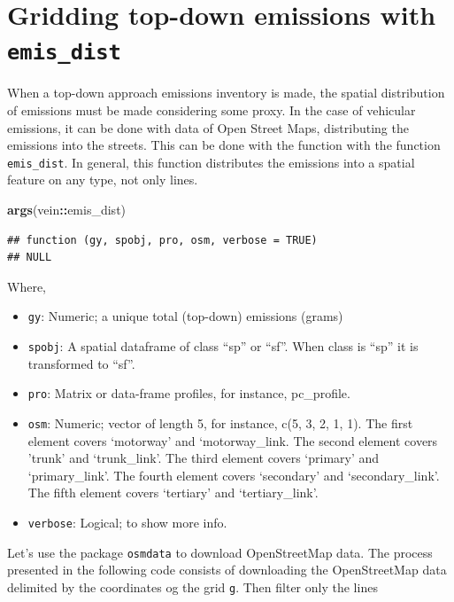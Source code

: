 \documentclass[12pt,graybox,envcountchap,sectrefs]{krantz}
\makeatletter
\newenvironment{Shaded}{\begin{snugshade}}{\end{snugshade}}
\newcommand{\KeywordTok}[1]{\textcolor[rgb]{0.13,0.29,0.53}{\textbf{#1}}}
\newcommand{\OperatorTok}[1]{\textcolor[rgb]{0.81,0.36,0.00}{\textbf{#1}}}
\newcommand{\NormalTok}[1]{#1}
\providecommand{\tightlist}{%
  \setlength{\itemsep}{0pt}\setlength{\parskip}{0pt}}
\newenvironment{kframe}{%
\medskip{}
\setlength{\fboxsep}{.8em}
 \def\at@end@of@kframe{}%
 \ifinner\ifhmode%
  \def\at@end@of@kframe{\end{minipage}}%
  \begin{minipage}{\columnwidth}%
 \fi\fi%
 \def\FrameCommand##1{\hskip\@totalleftmargin \hskip-\fboxsep
 \colorbox{shadecolor}{##1}\hskip-\fboxsep
     \hskip-\linewidth \hskip-\@totalleftmargin \hskip\columnwidth}%
 \MakeFramed {\advance\hsize-\width
   \@totalleftmargin\z@ \linewidth\hsize
   \@setminipage}}%
 {\par\unskip\endMakeFramed%
 \at@end@of@kframe}
\renewenvironment{Shaded}{\begin{kframe}}{\end{kframe}}
\theoremstyle{definition}
\theoremstyle{definition}
\theoremstyle{definition}
\theoremstyle{remark}
\makeatother
\begin{document}
\section{\texorpdfstring{Gridding top-down emissions with
\texttt{emis\_dist}}{Gridding top-down emissions with emis\_dist}}\label{gridding-top-down-emissions-with-emis_dist}

When a top-down approach emissions inventory is made, the spatial
distribution of emissions must be made considering some proxy. In the
case of vehicular emissions, it can be done with data of Open Street
Maps, distributing the emissions into the streets. This can be done with
the function with the function \texttt{emis\_dist}. In general, this
function distributes the emissions into a spatial feature on any type,
not only lines.

\begin{Shaded}
\begin{Highlighting}[]
\KeywordTok{args}\NormalTok{(vein}\OperatorTok{::}\NormalTok{emis_dist)}
\end{Highlighting}
\end{Shaded}

\begin{verbatim}
## function (gy, spobj, pro, osm, verbose = TRUE) 
## NULL
\end{verbatim}

Where,

\begin{itemize}
\tightlist
\item
  \texttt{gy}: Numeric; a unique total (top-down) emissions (grams)
\item
  \texttt{spobj}: A spatial dataframe of class ``sp'' or ``sf''. When
  class is ``sp'' it is transformed to ``sf''.
\item
  \texttt{pro}: Matrix or data-frame profiles, for instance,
  pc\_profile.
\item
  \texttt{osm}: Numeric; vector of length 5, for instance, c(5, 3, 2, 1,
  1). The first element covers `motorway' and `motorway\_link. The
  second element covers 'trunk' and `trunk\_link'. The third element
  covers `primary' and `primary\_link'. The fourth element covers
  `secondary' and `secondary\_link'. The fifth element covers `tertiary'
  and `tertiary\_link'.
\item
  \texttt{verbose}: Logical; to show more info.
\end{itemize}

Let's use the package \texttt{osmdata} to download OpenStreetMap data.
The process presented in the following code consists of downloading the
OpenStreetMap data delimited by the coordinates og the grid \texttt{g}.
Then filter only the lines
\end{document}
